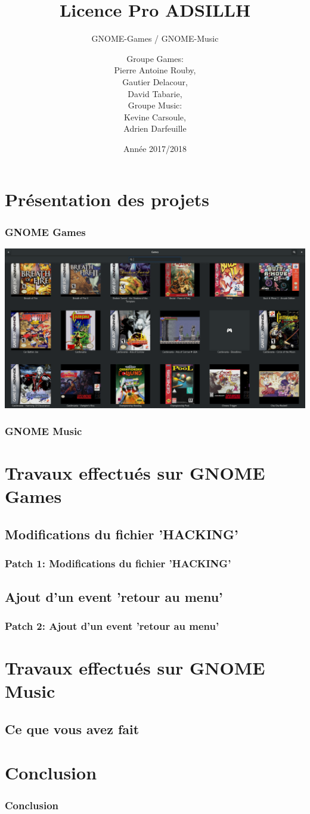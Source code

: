 \documentclass{beamer}
\title{Licence Pro ADSILLH}
\subtitle{GNOME-Games / GNOME-Music}
\author{Groupe Games:\\ Pierre Antoine Rouby,\\ Gautier Delacour,\\
  David Tabarie,\\
  \vspace{0.8cm}
  Groupe Music:\\ Kevine Carsoule,\\ Adrien Darfeuille}
\date{Année 2017/2018}
\begin{document}
\frame{\titlepage}

\section{Présentation des projets}

\begin{frame}
  \frametitle{GNOME Games}
  \includegraphics[scale=0.178]{images/screen-games.png}
\end{frame}

\begin{frame}
  \frametitle{GNOME Music}
\end{frame}

\section{Travaux effectués sur GNOME Games}
\subsection{Modifications du fichier 'HACKING'}
\begin{frame}
  \frametitle{Patch 1: Modifications du fichier 'HACKING'}
\end{frame}

\subsection{Ajout d'un event 'retour au menu'}
\begin{frame}
  \frametitle{Patch 2: Ajout d'un event 'retour au menu'}
\end{frame}

\section{Travaux effectués sur GNOME Music}
\subsection{Ce que vous avez fait}
\begin{frame}
  \frametitle{}
\end{frame}

\section{Conclusion}
\begin{frame}
  \frametitle{Conclusion}
\end{frame}
\end{document}
